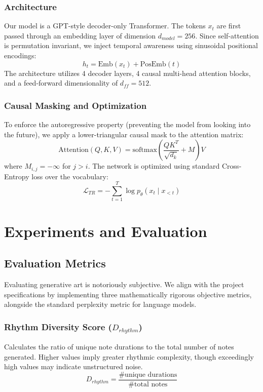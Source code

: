 \documentclass[conference]{IEEEtran}
\begin{document}
\subsubsection{Architecture}
Our model is a GPT-style decoder-only Transformer. The tokens $x_t$ are first passed through an embedding layer of dimension $d_{model}=256$. Since self-attention is permutation invariant, we inject temporal awareness using sinusoidal positional encodings:
\begin{equation}
    h_t = \text{Emb}(x_t) + \text{PosEmb}(t)
\end{equation}
The architecture utilizes 4 decoder layers, 4 causal multi-head attention blocks, and a feed-forward dimensionality of $d_{ff}=512$. 

\subsubsection{Causal Masking and Optimization}
To enforce the autoregressive property (preventing the model from looking into the future), we apply a lower-triangular causal mask to the attention matrix:
\begin{equation}
    \text{Attention}(Q, K, V) = \text{softmax}\left(\frac{QK^T}{\sqrt{d_k}} + M\right)V
\end{equation}
where $M_{i,j} = -\infty$ for $j > i$.
The network is optimized using standard Cross-Entropy loss over the vocabulary:
\begin{equation}
    \mathcal{L}_{TR} = - \sum_{t=1}^{T} \log p_\theta(x_t \mid x_{<t})
\end{equation}

\section{Experiments and Evaluation}

\subsection{Evaluation Metrics}
Evaluating generative art is notoriously subjective. We align with the project specifications by implementing three mathematically rigorous objective metrics, alongside the standard perplexity metric for language models.

\subsubsection{Rhythm Diversity Score ($D_{rhythm}$)}
Calculates the ratio of unique note durations to the total number of notes generated. Higher values imply greater rhythmic complexity, though exceedingly high values may indicate unstructured noise.
\begin{equation}
    D_{rhythm} = \frac{\# \text{unique durations}}{\# \text{total notes}}
\end{equation}
\end{document}
